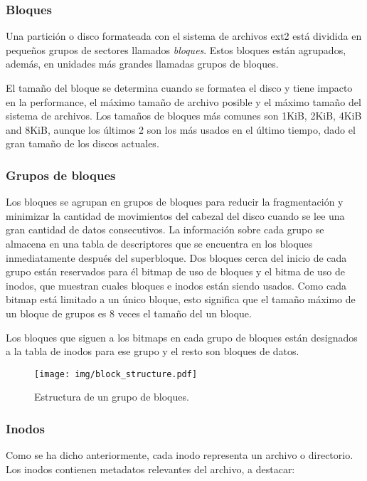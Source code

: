 \subsubsection{Bloques}
Una partición o disco formateada con el sistema de archivos ext2 está dividida en pequeños grupos de sectores llamados \emph{bloques}. Estos bloques están agrupados, además, en unidades más grandes llamadas grupos de bloques.

El tamaño del bloque se determina cuando se formatea el disco y tiene impacto en la performance, el máximo tamaño de archivo posible y el máximo tamaño del sistema de archivos. Los tamaños de bloques más comunes son 1KiB, 2KiB, 4KiB and 8KiB, aunque los últimos 2 son los más usados en el último tiempo, dado el gran tamaño de los discos actuales.

\subsubsection{Grupos de bloques}

Los bloques se agrupan en grupos de bloques para reducir la fragmentación y minimizar la cantidad de movimientos del cabezal del disco cuando se lee una gran cantidad de datos consecutivos. La información sobre cada grupo se almacena en una tabla de descriptores que se encuentra en los bloques inmediatamente después del superbloque. 
Dos bloques cerca del inicio de cada grupo están reservados para \'el bitmap de uso de bloques y el bitma de uso de inodos, que muestran cuales bloques e inodos están siendo usados.
Como cada bitmap está limitado a un único bloque, esto significa que el tamaño máximo de un bloque de grupos es 8 veces el tamaño del un bloque.

Los bloques que siguen a los bitmaps en cada grupo de bloques están designados a la tabla de inodos para ese grupo y el resto son bloques de datos.


\begin{figure}[H]
  \centering
  \texttt{[image: img/block\_structure.pdf]}
  \caption{Estructura de un grupo de bloques.}
\end{figure}

\subsubsection{Inodos}

Como se ha dicho anteriormente, cada inodo representa un archivo o directorio. Los inodos contienen metadatos relevantes del archivo, a destacar:

